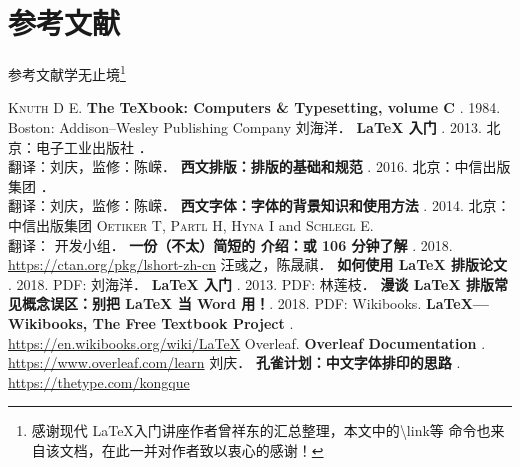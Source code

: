 \documentclass[fontset = none, t]{ctexbeamer}
\begin{document}
\section[参考文献]{参考文献}
\begin{frame}[fragile]{参考文献}{学无止境\footnote[frame,1]{感谢现代
      \LaTeX 入门讲座作者曾祥东的汇总整理，本文中的{\textbackslash link}等
      命令也来自该文档，在此一并对作者致以衷心的感谢！}}
\begin{spacing}{1.3}
\begin{multicols}{2}
\tiny
\newcommand\BOOK[1]{\textbf{#1}}
\newcommand\TAG[1]{\CASE{[#1]}}
\begin{thebibliography}{99}
  \bibitem{}
    \textsc{Knuth D E}.
    \newblock \BOOK{The \TeX book: Computers \& Typesetting, volume C} \TAG{M}. 1984.
    \newblock Boston: Addison--Wesley Publishing Company
  \bibitem{}
    刘海洋．
    \newblock \BOOK{\LaTeX{} 入门} \TAG{M}. 2013.
    \newblock 北京：电子工业出版社
  \bibitem{}
    ．\\
    翻译：刘庆，监修：陈嵘．
    \newblock \BOOK{西文排版：排版的基础和规范} \TAG{M}. 2016.
    \newblock 北京：中信出版集团
  \bibitem{}
    ．\\
    翻译：刘庆，监修：陈嵘．
    \newblock \BOOK{西文字体：字体的背景知识和使用方法} \TAG{M}. 2014.
    \newblock 北京：中信出版集团
  \bibitem{}
    \textsc{Oetiker T}, \textsc{Partl H}, \textsc{Hyna I} and \textsc{Schlegl E}.\\
    翻译：\CTeX{} 开发小组．
    \newblock \BOOK{一份（不太）简短的 \LaTeXe{} 介绍：或 106 分钟了解 \LaTeXe{}} \TAG{EB/OL}. 2018.
    \newblock \url{https://ctan.org/pkg/lshort-zh-cn}
  \bibitem{}
    汪彧之，陈晟祺．
    \newblock \BOOK{如何使用 \LaTeX{} 排版论文} \TAG{EB/OL}. 2018.
    \newblock PDF:
      \href{https://github.com/tuna/thulib-latex-talk/raw/master/latex-talk.pdf}{\faDownload}
  \bibitem{}
    刘海洋．
    \newblock \BOOK{\LaTeX{} 入门} \TAG{EB/OL}. 2013.
    \newblock PDF:
      \href{https://bbs.pku.edu.cn/attach/e7/f2/e7f2bb698b9c3672/tex_intro_talk.pdf}{\faDownload}
  \bibitem{}
    林莲枝．
    \newblock \BOOK{漫谈 \LaTeX{} 排版常见概念误区：别把 \LaTeX{} 当 Word 用！}\TAG{EB/OL}. 2018.
    \newblock PDF:
      \href{http://static.latexstudio.net/wp-content/uploads/2018/03/LianTze-presentation-0320-forReading.pdf}{\faDownload}
  \bibitem{}
    Wikibooks.
    \newblock \BOOK{\LaTeX{}---Wikibooks, The Free Textbook Project} \TAG{EB/OL}.
    \newblock \url{https://en.wikibooks.org/wiki/LaTeX}
  \bibitem{}
    Overleaf.
    \newblock \BOOK{Overleaf Documentation} \TAG{EB/OL}.
    \newblock \url{https://www.overleaf.com/learn}
  \bibitem{}
    刘庆．
    \newblock \BOOK{孔雀计划：中文字体排印的思路} \TAG{EB/OL}.
    \newblock \url{https://thetype.com/kongque}
\end{thebibliography}
\end{multicols}
\end{spacing}
\end{frame}
\end{document}
